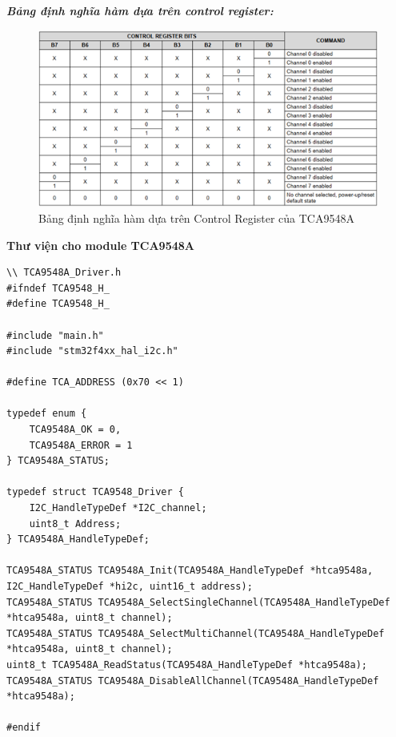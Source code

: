 \textbf{\textit{Bảng định nghĩa hàm dựa trên control register:}}
\begin{figure}[H]
	\centering
	\includegraphics[scale=1]{Chapters/Chapter5/Images/ControlRegisterTCA.png}
	\caption{Bảng định nghĩa hàm dựa trên Control Register của TCA9548A}
	\label{fig:C5ControlRegisterTCA}
\end{figure}

\textbf{Thư viện cho module TCA9548A}
\begin{lstlisting}
\\ TCA9548A_Driver.h
#ifndef TCA9548_H_
#define TCA9548_H_

#include "main.h"
#include "stm32f4xx_hal_i2c.h"

#define TCA_ADDRESS (0x70 << 1)

typedef enum {
    TCA9548A_OK = 0,
    TCA9548A_ERROR = 1
} TCA9548A_STATUS;

typedef struct TCA9548_Driver {
    I2C_HandleTypeDef *I2C_channel;
    uint8_t Address;
} TCA9548A_HandleTypeDef;

TCA9548A_STATUS TCA9548A_Init(TCA9548A_HandleTypeDef *htca9548a, I2C_HandleTypeDef *hi2c, uint16_t address);
TCA9548A_STATUS TCA9548A_SelectSingleChannel(TCA9548A_HandleTypeDef *htca9548a, uint8_t channel);
TCA9548A_STATUS TCA9548A_SelectMultiChannel(TCA9548A_HandleTypeDef *htca9548a, uint8_t channel);
uint8_t TCA9548A_ReadStatus(TCA9548A_HandleTypeDef *htca9548a);
TCA9548A_STATUS TCA9548A_DisableAllChannel(TCA9548A_HandleTypeDef *htca9548a);

#endif
\end{lstlisting}


